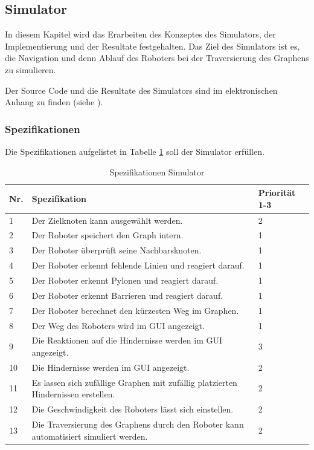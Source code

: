\subsection{Simulator}

In diesem Kapitel wird das Erarbeiten des Konzeptes des Simulators, der Implementierung und der Resultate festgehalten. Das Ziel des Simulators ist es, die Navigation und denn Ablauf des Roboters bei der Traversierung des Graphens zu simulieren.

Der Source Code und die Resultate des Simulators sind im elektronischen Anhang zu finden (siehe ).

\subsubsection{Spezifikationen}

Die Spezifikationen aufgelistet in Tabelle \ref{table:spezifikation-simulator} soll der Simulator erfüllen.

\begin{table}[H]
\centering
\small
\begin{tabularx}{\textwidth}{|l|X|l|}
\hline
  \textbf{Nr.} & \textbf{Spezifikation} & \textbf{Priorität 1-3}  \\
  \hline
  1  & Der Zielknoten kann ausgewählt werden. &  2\\
  \hline
   2   & Der Roboter speichert den Graph intern.  & 1\\
  \hline
   3 & Der Roboter überprüft seine Nachbarsknoten.&1\\
  \hline
  4 & Der Roboter erkennt fehlende Linien und reagiert darauf. & 1\\
  \hline
  5 &   Der Roboter erkennt Pylonen und reagiert darauf. & 1\\
  \hline
   6  &   Der Roboter erkennt Barrieren und reagiert darauf. & 1\\
  \hline
    7 &   Der Roboter berechnet den kürzesten Weg im Graphen.& 1\\
  \hline
     8  &   Der Weg des Roboters wird im GUI angezeigt. & 1\\
  \hline
      9   &   Die Reaktionen auf die Hindernisse werden im GUI angezeigt. & 3\\
  \hline
 10   &   Die Hindernisse werden im GUI angezeigt. & 2\\
  \hline
   11   &   Es lassen sich zufällige Graphen mit zufällig platzierten Hindernissen erstellen. & 2\\
  \hline
   12   &   Die Geschwindigkeit des Roboters lässt sich einstellen. & 2\\
  \hline
   13   &   Die Traversierung des Graphens durch den Roboter kann automatisiert simuliert werden. & 2\\
  \hline

\end{tabularx}
\caption{Spezifikationen Simulator}
\label{table:spezifikation-simulator}
\end{table}

